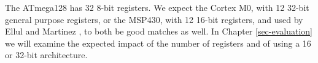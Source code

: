 The ATmega128 has 32 8-bit registers. We expect the Cortex M0, with 12 32-bit general purpose registers, or the MSP430, with 12 16-bit registers, and used by Ellul and Martinez \cite{Ellul:2010iw}, to both be good matches as well. In Chapter \ref{sec-evaluation} we will examine the expected impact of the number of registers and of using a 16 or 32-bit architecture.








